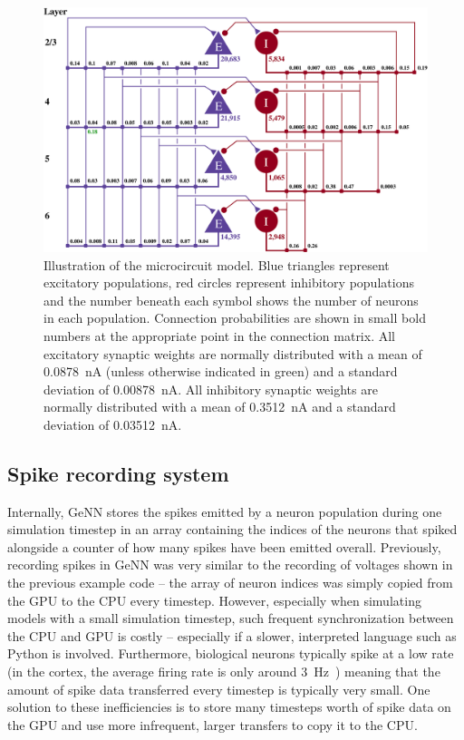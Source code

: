 \documentclass[utf8]{frontiersSCNS} %
\begin{document}
%
\begin{figure}[t!]
    \begin{center}
        \includegraphics[width=180mm]{figures/potjans_circuit_v2.eps}
    \end{center}
    \caption{Illustration of the microcircuit model.
    Blue triangles represent excitatory populations, red circles represent inhibitory populations and the number beneath each symbol shows the number of neurons in each population.
    Connection probabilities are shown in small bold numbers at the appropriate point in the connection matrix.
    All excitatory synaptic weights are normally distributed with a mean of \SI{0.0878}{\nano\ampere} (unless otherwise indicated in green) and a standard deviation of \SI{0.00878}{\nano\ampere}.
    All inhibitory synaptic weights are normally distributed with a mean of \SI{0.3512}{\nano\ampere} and a standard deviation of \SI{0.03512}{\nano\ampere}.}
    \label{fig:potjans_circuit}
\end{figure}
%
\subsection{Spike recording system}
\label{sec:methods/spike_recording}
Internally, GeNN stores the spikes emitted by a neuron population during one simulation timestep in an array containing the indices of the neurons that spiked alongside a counter of how many spikes have been emitted overall.
Previously, recording spikes in GeNN was very similar to the recording of voltages shown in the previous example code -- the array of neuron indices was simply copied from the GPU to the CPU every timestep.
However, especially when simulating models with a small simulation timestep, such frequent synchronization between the CPU and GPU is costly -- especially if a slower, interpreted language such as Python is involved.
Furthermore, biological neurons typically spike at a low rate (in the cortex, the average firing rate is only around \SI{3}{\hertz}~\citep{Buzsaki2014}) meaning that the amount of spike data transferred every timestep is typically very small.
One solution to these inefficiencies is to store many timesteps worth of spike data on the GPU and use more infrequent, larger transfers to copy it to the CPU.
\end{document}
